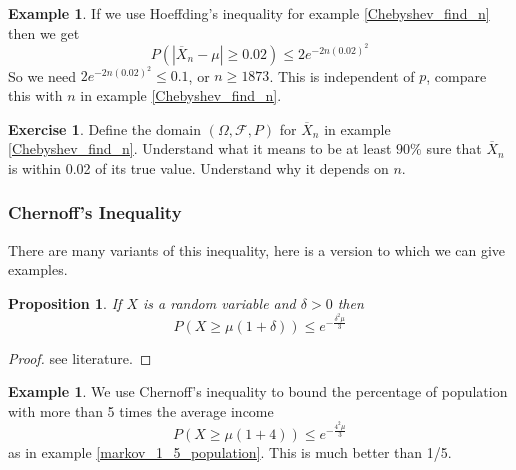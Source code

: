 \documentclass[12pt]{amsart}
\newtheorem{proposition}[theorem]{Proposition}
\theoremstyle{definition}
\newtheorem{example}[theorem]{Example}
\newtheorem{exercise}[theorem]{Exercise}
\begin{document}
\begin{example} If we use Hoeffding's inequality for example \ref{Chebyshev_find_n} then we get
$$P(|\overline{X}_n - \mu |\geq 0.02)\leq 2e^{-2n (0.02)^2}$$
So we need $2e^{-2n (0.02)^2} \leq 0.1$, or $n \geq 1873$. This is independent of $p$, compare this with $n$ in example \ref{Chebyshev_find_n}.
\end{example}

\begin{exercise} Define the domain $(\Omega, \mathcal{F}, P)$ for $\overline{X}_n$ in example \ref{Chebyshev_find_n}. Understand what it means to be at least $90\%$ sure that $\overline{X}_n$ is within 0.02 of its true value. Understand why it depends on $n$.
\end{exercise}

\subsubsection{Chernoff's Inequality} There are many variants of this inequality, here is a version to which we can give examples.

\begin{proposition} If $X$ is a random variable and $\delta > 0$ then
$$P(X \geq \mu(1+\delta)) \leq e^{-\frac{\delta^2\mu}{3}}$$
\end{proposition}
\begin{proof} see literature.
\end{proof}

\begin{example} We use Chernoff's inequality to bound the percentage of population with more than 5 times the average income
$$P(X \geq \mu(1+4)) \leq e^{-\frac{4^2\mu}{3}}$$
as in example \ref{markov_1_5_population}. This is much better than 1/5.
\end{example}
\end{document}
